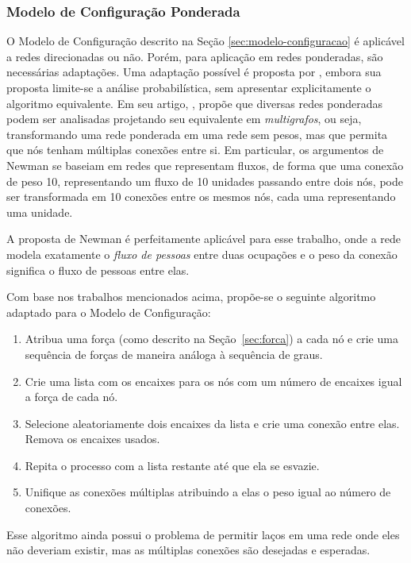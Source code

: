 \documentclass[12pt,a4paper]{article}
\theoremstyle{hypo}
\begin{document}
\subsubsection{Modelo de Configuração Ponderada} \label{sec:modelo-configuracao-ponderada}

O Modelo de Configuração descrito na Seção \ref{sec:modelo-configuracao} é aplicável a redes direcionadas ou não. Porém, para aplicação em redes ponderadas, são necessárias adaptações. Uma adaptação possível é proposta por , embora sua proposta limite-se a análise probabilística, sem apresentar explicitamente o algoritmo equivalente. Em seu artigo, , propõe que diversas redes ponderadas podem ser analisadas projetando seu equivalente em \textit{multigrafos}, ou seja, transformando uma rede ponderada em uma rede sem pesos, mas que permita que nós tenham múltiplas conexões entre si. Em particular, os argumentos de Newman se baseiam em redes que representam fluxos, de forma que uma conexão de peso 10, representando um fluxo de 10 unidades passando entre dois nós, pode ser transformada em 10 conexões entre os mesmos nós, cada uma representando uma unidade.

A proposta de Newman é perfeitamente aplicável para esse trabalho, onde a rede modela exatamente o \textit{fluxo de pessoas} entre duas ocupações e o peso da conexão significa o fluxo de pessoas entre elas.

Com base nos trabalhos mencionados acima, propõe-se o seguinte algoritmo adaptado para o Modelo de Configuração:

\begin{enumerate}
\item Atribua uma força (como descrito na Seção~\ref{sec:forca}) a cada nó e crie uma sequência de forças de maneira análoga à sequência de graus.
\item Crie uma lista com os encaixes para os nós com um número de encaixes igual a força de cada nó.
\item Selecione aleatoriamente dois encaixes da lista e crie uma conexão entre elas. Remova os encaixes usados.
\item Repita o processo com a lista restante até que ela se esvazie.
\item Unifique as conexões múltiplas atribuindo a elas o peso igual ao número de conexões.
\end{enumerate}

Esse algoritmo ainda possui o problema de permitir laços em uma rede onde eles não deveriam existir, mas as múltiplas conexões são desejadas e esperadas.
\end{document}
